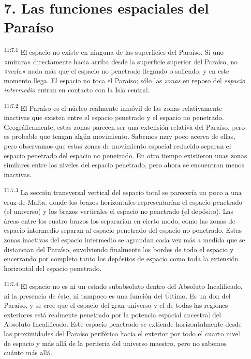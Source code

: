 \section*{7. Las funciones espaciales del Paraíso}
\par
\textsuperscript{11:7.1} El espacio no existe en ninguna de las superficies del Paraíso. Si uno «mirara» directamente hacia arriba desde la superficie superior del Paraíso, no «vería» nada más que el espacio no penetrado llegando o saliendo, y en este momento llega. El espacio no toca el Paraíso; sólo las \textit{zonas} en reposo del \textit{espacio intermedio} entran en contacto con la Isla central.

\par
\textsuperscript{11:7.2} El Paraíso es el núcleo realmente inmóvil de las zonas relativamente inactivas que existen entre el espacio penetrado y el espacio no penetrado. Geográficamente, estas zonas parecen ser una extensión relativa del Paraíso, pero es probable que tengan algún movimiento. Sabemos muy poco acerca de ellas, pero observamos que estas zonas de movimiento espacial reducido separan el espacio penetrado del espacio no penetrado. En otro tiempo existieron unas zonas similares entre los niveles del espacio penetrado, pero ahora se encuentran menos inactivas.

\par
\textsuperscript{11:7.3} La sección transversal vertical del espacio total se parecería un poco a una cruz de Malta, donde los brazos horizontales representarían el espacio penetrado (el universo) y los brazos verticales el espacio no penetrado (el depósito). Las áreas entre los cuatro brazos los separarían en cierto modo, como las zonas de espacio intermedio separan al espacio penetrado del espacio no penetrado. Estas zonas inactivas del espacio intermedio se agrandan cada vez más a medida que se distancian del Paraíso, envolviendo finalmente los bordes de todo el espacio y encerrando por completo tanto los depósitos de espacio como toda la extensión horizontal del espacio penetrado.

\par
\textsuperscript{11:7.4} El espacio no es ni un estado subabsoluto dentro del Absoluto Incalificado, ni la presencia de éste, ni tampoco es una función del Último. Es un don del Paraíso, y se cree que el espacio del gran universo y el de todas las regiones exteriores está realmente penetrado por la potencia espacial ancestral del Absoluto Incalificado. Este espacio penetrado se extiende horizontalmente desde las proximidades del Paraíso periférico hacia el exterior por todo el cuarto nivel de espacio y más allá de la periferia del universo maestro, pero no sabemos cuánto más allá.

